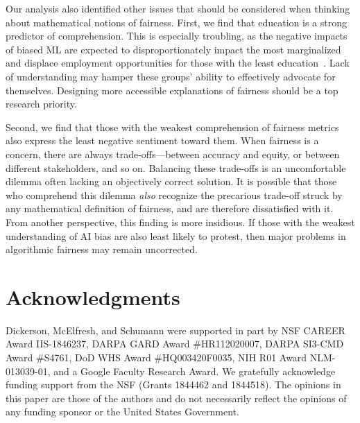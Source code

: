 \documentclass{article}
\newcommand{\jpd}[1]{{\color{magenta}{JPD: #1}}}
\newcommand{\jpd}[1]{}
\begin{document}
Our analysis also identified other issues that should be considered when thinking about mathematical notions of fairness.
First, we find that education is a strong
predictor of comprehension. This is especially troubling, as the negative impacts of biased ML are expected to disproportionately impact the most marginalized~\cite{barocas2016big} and displace employment opportunities for those with the least education~\cite{frey2017future}. Lack of understanding may hamper these groups' ability to effectively advocate for themselves. Designing more accessible explanations of fairness should be a top research priority. 

Second, we find that those with the weakest comprehension of fairness metrics also express the least negative sentiment toward them. When fairness is a concern, there are always trade-offs---between accuracy and equity, or between different stakeholders, and so on. Balancing these trade-offs is an uncomfortable dilemma often lacking an objectively correct solution. It is possible that those who comprehend this dilemma \emph{also} recognize the precarious trade-off struck by any mathematical definition of fairness, and are therefore dissatisfied with it. From another perspective, this finding is more insidious. If those with the weakest understanding of AI bias are also least likely to protest, then major problems in algorithmic fairness may remain uncorrected.



\section*{Acknowledgments}
\jpd{Apparently these don't count toward the page limit for the body of the paper, ``It has now been decided that the acknowledgments section might appear after the 9th page (along with references). The paper checker has been updated accordingly.''}
Dickerson, McElfresh, and Schumann were supported in part by NSF CAREER Award IIS-1846237, DARPA GARD Award \#HR112020007, DARPA SI3-CMD Award \#S4761, DoD WHS Award \#HQ003420F0035, NIH R01 Award NLM-013039-01, and a Google Faculty Research Award.
We gratefully acknowledge funding support from the NSF (Grants 1844462 and 1844518).
The opinions in this paper are those of the authors and do not necessarily reflect the opinions of any funding sponsor or the United States Government.
 



\appendix
\clearpage
\end{document}

